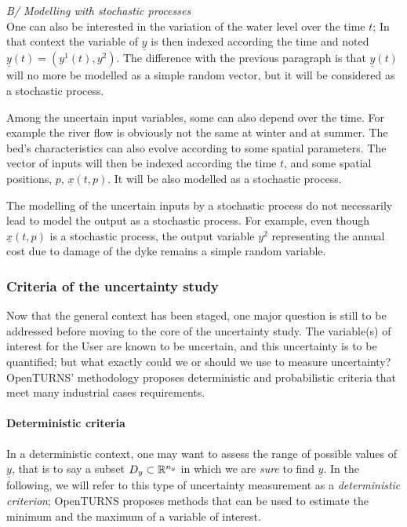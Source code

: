 \textit{B/ Modelling with stochastic processes}\\
One can also be interested in the variation of the water level over the time $t$; In that context the variable of $\underline{y}$ is then indexed according the time and noted $ \underline{y}(t)= \left( y^1(t),y^2 \right)$. The difference with the previous paragraph is that $\underline{y}(t)$ will no more be modelled as a simple random vector, but it will be considered as a stochastic process.

Among the uncertain input variables, some can also depend over the time. For example the river flow is obviously not the same at winter and at summer.
The bed's characteristics can also evolve according to some spatial parameters. The vector of inputs will then be indexed according the time $t$, and some spatial positions, $p$,
$\underline{x}(t,p)$. It will be also modelled as a stochastic process.

The modelling of the uncertain inputs by a stochastic process do not necessarily lead to model the output as a stochastic process. For example, even though $\underline{x}(t,p)$ is a stochastic process, the output variable $y^2$ representing the annual cost due to damage of the dyke remains a simple random variable.

\subsubsection{Criteria of the uncertainty study}

Now that the general context has been staged, one major question is still to be addressed before moving to the core of the uncertainty study. The variable(s) of interest for the User are known to be uncertain, and this uncertainty is to be quantified; but what exactly could we or should we use to measure uncertainty? OpenTURNS' methodology proposes deterministic and probabilistic criteria that meet many industrial cases requirements.



\paragraph{Deterministic criteria}
\par

In a deterministic context, one may want to assess the range of possible values of $\underline{y}$, that is to say a subset $D_y \subset {\mathbb R}^{n_y}$ in which we are {\em sure} to find $\underline{y}$. In the following, we will refer to this type of uncertainty measurement as a {\em deterministic criterion}; OpenTURNS proposes methods that can be used to estimate the minimum and the maximum of a variable of interest.

